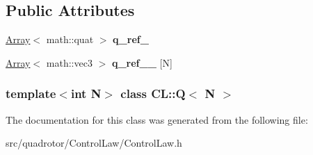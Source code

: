 \subsection*{\-Public \-Attributes}
\begin{DoxyCompactItemize}
\item 
\hypertarget{classCL_1_1Q_a1280b14c80c8b20c412a238eedb2ff6c}{\hyperlink{classArray}{\-Array}$<$ math\-::quat $>$ {\bfseries q\-\_\-ref\-\_\-}}\label{classCL_1_1Q_a1280b14c80c8b20c412a238eedb2ff6c}

\item 
\hypertarget{classCL_1_1Q_af7862277ebb36e485ca19c4bb3e8bdcd}{\hyperlink{classArray}{\-Array}$<$ math\-::vec3 $>$ {\bfseries q\-\_\-ref\-\_\-\-\_\-} \mbox{[}\-N\mbox{]}}\label{classCL_1_1Q_af7862277ebb36e485ca19c4bb3e8bdcd}

\end{DoxyCompactItemize}
\subsubsection*{template$<$int \-N$>$ class C\-L\-::\-Q$<$ N $>$}



\-The documentation for this class was generated from the following file\-:\begin{DoxyCompactItemize}
\item 
src/quadrotor/\-Control\-Law/\-Control\-Law.\-h\end{DoxyCompactItemize}

